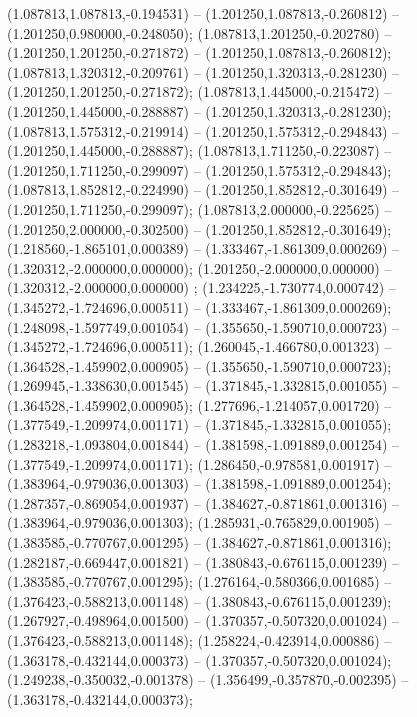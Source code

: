  (1.087813,1.087813,-0.194531) -- (1.201250,1.087813,-0.260812) -- (1.201250,0.980000,-0.248050);
 (1.087813,1.201250,-0.202780) -- (1.201250,1.201250,-0.271872) -- (1.201250,1.087813,-0.260812);
 (1.087813,1.320312,-0.209761) -- (1.201250,1.320313,-0.281230) -- (1.201250,1.201250,-0.271872);
 (1.087813,1.445000,-0.215472) -- (1.201250,1.445000,-0.288887) -- (1.201250,1.320313,-0.281230);
 (1.087813,1.575312,-0.219914) -- (1.201250,1.575312,-0.294843) -- (1.201250,1.445000,-0.288887);
 (1.087813,1.711250,-0.223087) -- (1.201250,1.711250,-0.299097) -- (1.201250,1.575312,-0.294843);
 (1.087813,1.852812,-0.224990) -- (1.201250,1.852812,-0.301649) -- (1.201250,1.711250,-0.299097);
 (1.087813,2.000000,-0.225625) -- (1.201250,2.000000,-0.302500) -- (1.201250,1.852812,-0.301649);
 (1.218560,-1.865101,0.000389) -- (1.333467,-1.861309,0.000269) -- (1.320312,-2.000000,0.000000);
 (1.201250,-2.000000,0.000000) -- (1.320312,-2.000000,0.000000) ;
 (1.234225,-1.730774,0.000742) -- (1.345272,-1.724696,0.000511) -- (1.333467,-1.861309,0.000269);
 (1.248098,-1.597749,0.001054) -- (1.355650,-1.590710,0.000723) -- (1.345272,-1.724696,0.000511);
 (1.260045,-1.466780,0.001323) -- (1.364528,-1.459902,0.000905) -- (1.355650,-1.590710,0.000723);
 (1.269945,-1.338630,0.001545) -- (1.371845,-1.332815,0.001055) -- (1.364528,-1.459902,0.000905);
 (1.277696,-1.214057,0.001720) -- (1.377549,-1.209974,0.001171) -- (1.371845,-1.332815,0.001055);
 (1.283218,-1.093804,0.001844) -- (1.381598,-1.091889,0.001254) -- (1.377549,-1.209974,0.001171);
 (1.286450,-0.978581,0.001917) -- (1.383964,-0.979036,0.001303) -- (1.381598,-1.091889,0.001254);
 (1.287357,-0.869054,0.001937) -- (1.384627,-0.871861,0.001316) -- (1.383964,-0.979036,0.001303);
 (1.285931,-0.765829,0.001905) -- (1.383585,-0.770767,0.001295) -- (1.384627,-0.871861,0.001316);
 (1.282187,-0.669447,0.001821) -- (1.380843,-0.676115,0.001239) -- (1.383585,-0.770767,0.001295);
 (1.276164,-0.580366,0.001685) -- (1.376423,-0.588213,0.001148) -- (1.380843,-0.676115,0.001239);
 (1.267927,-0.498964,0.001500) -- (1.370357,-0.507320,0.001024) -- (1.376423,-0.588213,0.001148);
 (1.258224,-0.423914,0.000886) -- (1.363178,-0.432144,0.000373) -- (1.370357,-0.507320,0.001024);
 (1.249238,-0.350032,-0.001378) -- (1.356499,-0.357870,-0.002395) -- (1.363178,-0.432144,0.000373);
